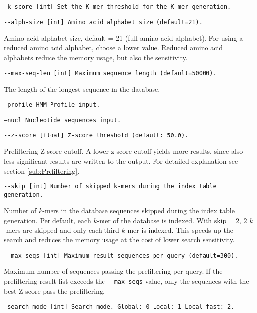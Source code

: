 \documentclass[11pt,a4paper]{report}
\begin{document}
\texttt{\small --k-score {[}int{]}  Set the K-mer threshold for the K-mer generation.}{\small \par}


\texttt{\small -{}-alph-size {[}int{]} Amino acid alphabet size (default=21).}{\small \par}

Amino acid alphabet size, default = 21 (full amino acid alphabet).
For using a reduced amino acid alphabet, choose a lower value. Reduced
amino acid alphabets reduce the memory usage, but also the sensitivity.

\texttt{\small -{}-max-seq-len {[}int{]} Maximum sequence length (default=50000).}{\small \par}

The length of the longest sequence in the database.

\texttt{\small --profile HMM Profile input.}{\small \par}


\texttt{\small --nucl Nucleotide sequences input.}{\small \par}

\texttt{\small -{}-z-score {[}float{]} Z-score threshold (default: 50.0).}{\small \par}

Prefiltering Z-score cutoff. A lower z-score cutoff yields more results,
since also less significant results are written to the output. For
detailed explanation see section \ref{sub:Prefiltering}.

\texttt{\small -{}-skip {[}int{]} Number of skipped k-mers during
the index table generation.}{\small \par}

Number of $k$-mers in the database sequences skipped during the index
table generation. Per default, each $k$-mer of the database is indexed.
With $\mathrm{skip}=2$, $2$ $k$-mers are skipped and only each
third $k$-mer is indexed. This speeds up the search and reduces the
memory usage at the cost of lower search sensitivity.

\texttt{\small -{}-max-seqs {[}int{]} Maximum result sequences per
query (default=300).}{\small \par}

Maximum number of sequences passing the prefiltering per query. If
the prefiltering result list exceeds the \texttt{-{}-max-seqs} value,
only the sequences with the best Z-score pass the prefiltering.

\texttt{\small --search-mode {[}int{]}  Search mode. Global: 0 Local: 1 Local fast: 2.}{\small \par}
\end{document}
